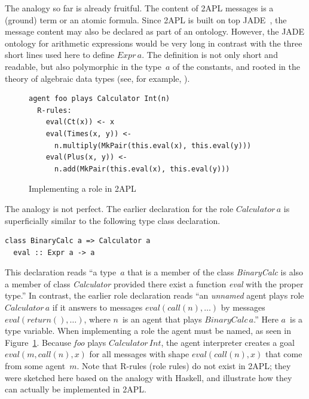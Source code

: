 \documentclass[a4paper,12pt,oneside,fleqn]{book} %
\begin{document}
The analogy so far is already fruitful. The content of 2APL messages is a
(ground) term or an atomic formula. Since 2APL is built on top
JADE~\cite{DBLP:books/sp/map2005/BellifemineBCP05}, the message content may
also be declared as part of an ontology. However, the JADE ontology for
arithmetic expressions would be very long in contrast with the three short
lines used here to define $\mathit{Expr}\,a$. The definition is not only
short and readable, but also polymorphic in the type~$a$ of the constants,
and rooted in the theory of algebraic data types (see, for example,
\cite{DBLP:conf/ctcs/Hagino87}).

\begin{figure}\footnotesize %
\begin{verbatim}
agent foo plays Calculator Int(n)
  R-rules:
    eval(Ct(x)) <- x
    eval(Times(x, y)) <-
      n.multiply(MkPair(this.eval(x), this.eval(y)))
    eval(Plus(x, y)) <-
      n.add(MkPair(this.eval(x), this.eval(y)))
\end{verbatim}
\caption{Implementing a role in 2APL}\label{fig:roleimpl2APL}
\end{figure} %

The analogy is not perfect. The earlier declaration for the role
$\mathit{Calculator}\,a$ is superficially similar to the following type
class declaration.
\begin{verbatim}
class BinaryCalc a => Calculator a
  eval :: Expr a -> a
\end{verbatim}

This declaration reads ``a type~$a$ that is a member of the class
\textit{BinaryCalc} is also a member of class \textit{Calculator} provided
there exist a function \textit{eval} with the proper type.'' In contrast,
the earlier role declaration reads ``an \emph{unnamed} agent plays role
$\mathit{Calculator}\,a$ if it answers to messages
$\mathit{eval}(\mathit{call}(n),\ldots)$ by messages
$\mathit{eval}(\mathit{return}(),\ldots)$, where $n$~is an agent that plays
$\mathit{BinaryCalc}\,a$.'' Here $a$~is a type variable.  When implementing
a role the agent must be named, as seen in Figure~\ref{fig:roleimpl2APL}.
Because \textit{foo} plays $\mathit{Calculator}\,\mathit{Int}$, the agent
interpreter creates a goal $\mathit{eval}(m,\mathit{call}(n),x)$ for all
messages with shape $\mathit{eval}(\mathit{call}(n),x)$ that come from some
agent~$m$. Note that R-rules (role rules) do not exist in 2APL;
they were sketched here based on the analogy with Haskell, and illustrate
how they can actually be implemented in 2APL.
\end{document}
